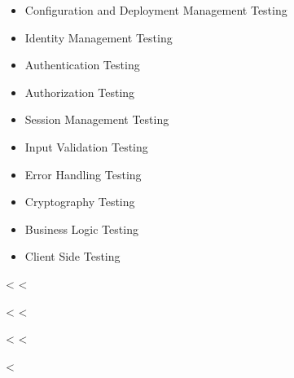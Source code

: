    \begin{itemize}
      \item Configuration and Deployment Management Testing
      \item Identity Management Testing
      \item Authentication Testing
      \item Authorization Testing
      \item Session Management Testing
      \item Input Validation Testing
      \item Error Handling Testing
      \item Cryptography Testing
      \item Business Logic Testing
      \item Client Side Testing
    \end{itemize}

  <%
  <%

  <%
  <%

  <%
  <%


<%
